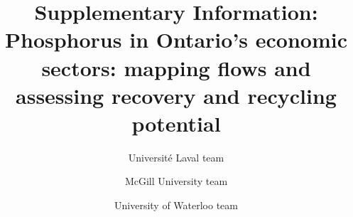 \documentclass[authoryear]{elsarticle}
\begin{document}
	\begin{frontmatter}
		\title{
			Supplementary Information: \\ Phosphorus in Ontario's economic sectors: mapping flows and assessing recovery and recycling potential
		}
		
		\author[ULaval]{Université Laval team}
		\author[McGill]{McGill University team}
		\author[Waterloo]{University of Waterloo team}
		
		\address[ULaval]{Université Laval}
		\address[McGill]{McGill University}
		\address[Waterloo]{University of Waterloo}
		
%			
	\end{frontmatter}
	
	\tableofcontents
	
\end{document}

